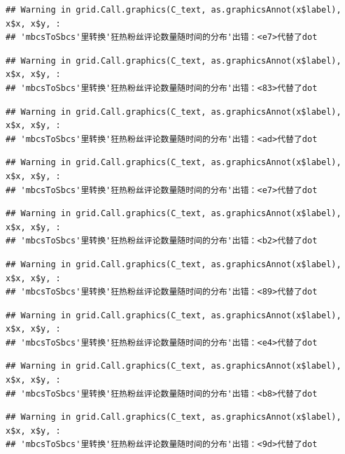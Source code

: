 \documentclass[
]{article}
\begin{document}
\begin{verbatim}
## Warning in grid.Call.graphics(C_text, as.graphicsAnnot(x$label), x$x, x$y, :
## 'mbcsToSbcs'里转换'狂热粉丝评论数量随时间的分布'出错：<e7>代替了dot
\end{verbatim}

\begin{verbatim}
## Warning in grid.Call.graphics(C_text, as.graphicsAnnot(x$label), x$x, x$y, :
## 'mbcsToSbcs'里转换'狂热粉丝评论数量随时间的分布'出错：<83>代替了dot
\end{verbatim}

\begin{verbatim}
## Warning in grid.Call.graphics(C_text, as.graphicsAnnot(x$label), x$x, x$y, :
## 'mbcsToSbcs'里转换'狂热粉丝评论数量随时间的分布'出错：<ad>代替了dot
\end{verbatim}

\begin{verbatim}
## Warning in grid.Call.graphics(C_text, as.graphicsAnnot(x$label), x$x, x$y, :
## 'mbcsToSbcs'里转换'狂热粉丝评论数量随时间的分布'出错：<e7>代替了dot
\end{verbatim}

\begin{verbatim}
## Warning in grid.Call.graphics(C_text, as.graphicsAnnot(x$label), x$x, x$y, :
## 'mbcsToSbcs'里转换'狂热粉丝评论数量随时间的分布'出错：<b2>代替了dot
\end{verbatim}

\begin{verbatim}
## Warning in grid.Call.graphics(C_text, as.graphicsAnnot(x$label), x$x, x$y, :
## 'mbcsToSbcs'里转换'狂热粉丝评论数量随时间的分布'出错：<89>代替了dot
\end{verbatim}

\begin{verbatim}
## Warning in grid.Call.graphics(C_text, as.graphicsAnnot(x$label), x$x, x$y, :
## 'mbcsToSbcs'里转换'狂热粉丝评论数量随时间的分布'出错：<e4>代替了dot
\end{verbatim}

\begin{verbatim}
## Warning in grid.Call.graphics(C_text, as.graphicsAnnot(x$label), x$x, x$y, :
## 'mbcsToSbcs'里转换'狂热粉丝评论数量随时间的分布'出错：<b8>代替了dot
\end{verbatim}

\begin{verbatim}
## Warning in grid.Call.graphics(C_text, as.graphicsAnnot(x$label), x$x, x$y, :
## 'mbcsToSbcs'里转换'狂热粉丝评论数量随时间的分布'出错：<9d>代替了dot
\end{verbatim}
\end{document}

